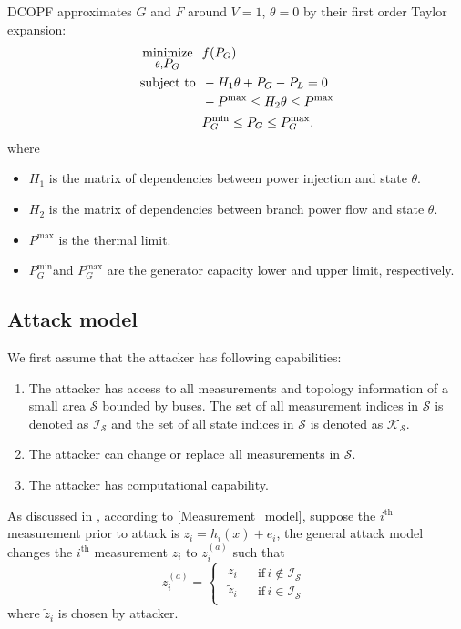 \documentclass[twocolumn,english,final,journal]{IEEEtran}
\theoremstyle{plain}
\theoremstyle{definition}
\begin{document}
DCOPF approximates $G$ and $F$ around $V=1$, $\theta=0$ by their first order Taylor
expansion:
\begin{align}
\mbox{\ensuremath{\underset{\theta,\mbox{\ensuremath{P_{G}}}}{\mbox{minimize}}}\:\:}\; & f(P_{G})\nonumber \\
\mbox{subject to}\:\; & -H_{1}\theta+P_{G}-P_{L}=0\label{eq:eq_DCOPF}\\
 & -P^{\max}\leq H_{2}\theta\leq P^{\max}\label{eq:ineq_DCOPF}\\
 & P_{G}^{\min}\leq P_{G}\leq P_{G}^{\max}.\label{eq:var_ValueRange-DC}
\end{align}
where
\begin{itemize}
\item $H_{1}$ is the matrix of dependencies between power injection  and
state $\theta$.
\item $H_{2}$ is the matrix of dependencies between branch power flow and
state $\theta$.
\item $P^{\max}$ is the thermal limit.
\item $P_{G}^{\min}$and $P_{G}^{\max}$ are the generator capacity lower
and upper limit, respectively.
\end{itemize}

\subsection{Attack model\label{sub:attack-model}}

We first assume that the attacker has following capabilities:
\begin{enumerate} 
\item The attacker has access to all measurements and topology information of a small area $\mathcal{S}$ bounded by buses. The set of all measurement indices in $\mathcal{S}$ is denoted as $\mathcal{I_{S}}$ and the set of all state indices in $\mathcal{S}$ is denoted as $\mathcal{K_{S}}$. 
\item The attacker can change or replace all measurements in $\mathcal{S}$. 
\item The attacker has computational capability.  
\end{enumerate}

As discussed in , according to \eqref{Measurement_model}, suppose the $i^{\mbox{th}}$ measurement prior to attack is $z_{i}=h_{i}(x)+e_{i}$, the general attack model changes the $i^{\mbox{th}}$ measurement $z_{i}$ to $z_{i}^{(a)}$ such that
\begin{equation}
z_{i}^{(a)}=\begin{cases}
\begin{array}{c}
z_{i}\\
\tilde{z}_{i}
\end{array} & \begin{array}{c}
\mathrm{if}\, i\notin\mathcal{I}_{\mathcal{S}}\\
\mathrm{if}\, i\in\mathcal{I}_{\mathcal{S}}
\end{array}\end{cases}\label{eq:aGeneral_attack_model}
\end{equation}
where $\tilde{z}_{i}$ is chosen by attacker.
\end{document}
